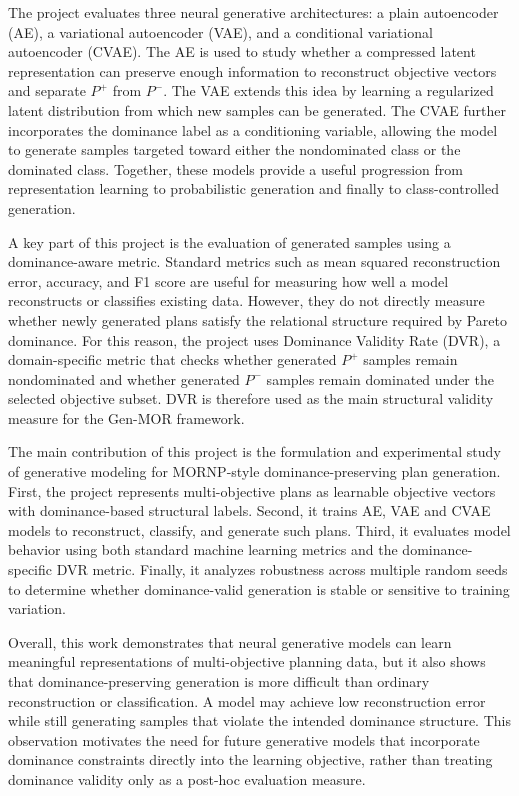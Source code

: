 The project evaluates three neural generative architectures: a plain autoencoder (AE), a variational autoencoder (VAE), and a conditional variational autoencoder (CVAE). The AE is used to study whether a compressed latent representation can preserve enough information to reconstruct objective vectors and separate $P^{+}$ from $P^{-}$. The VAE extends this idea by learning a regularized latent distribution from which new samples can be generated. The CVAE further incorporates the dominance label as a conditioning variable, allowing the model to generate samples targeted toward either the nondominated class or the dominated class. Together, these models provide a useful progression from representation learning to probabilistic generation and finally to class-controlled generation.

A key part of this project is the evaluation of generated samples using a dominance-aware metric. Standard metrics such as mean squared reconstruction error, accuracy, and F1 score are useful for measuring how well a model reconstructs or classifies existing data. However, they do not directly measure whether newly generated plans satisfy the relational structure required by Pareto dominance. For this reason, the project uses Dominance Validity Rate (DVR), a domain-specific metric that checks whether generated $P^{+}$ samples remain nondominated and whether generated $P^{-}$ samples remain dominated under the selected objective subset. DVR is therefore used as the main structural validity measure for the Gen-MOR framework.

The main contribution of this project is the formulation and experimental study of generative modeling for MORNP-style dominance-preserving plan generation. First, the project represents multi-objective plans as learnable objective vectors with dominance-based structural labels. Second, it trains AE, VAE and CVAE models to reconstruct, classify, and generate such plans. Third, it evaluates model behavior using both standard machine learning metrics and the dominance-specific DVR metric. Finally, it analyzes robustness across multiple random seeds to determine whether dominance-valid generation is stable or sensitive to training variation.

Overall, this work demonstrates that neural generative models can learn meaningful representations of multi-objective planning data, but it also shows that dominance-preserving generation is more difficult than ordinary reconstruction or classification. A model may achieve low reconstruction error while still generating samples that violate the intended dominance structure. This observation motivates the need for future generative models that incorporate dominance constraints directly into the learning objective, rather than treating dominance validity only as a post-hoc evaluation measure.